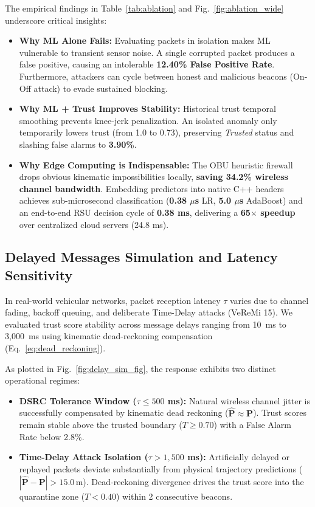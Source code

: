 \documentclass[conference]{IEEEtran}
\begin{document}
The empirical findings in Table~\ref{tab:ablation} and Fig.~\ref{fig:ablation_wide} underscore critical insights:
\begin{itemize}
    \item \textbf{Why ML Alone Fails:} Evaluating packets in isolation makes ML vulnerable to transient sensor noise. A single corrupted packet produces a false positive, causing an intolerable \textbf{12.40\% False Positive Rate}. Furthermore, attackers can cycle between honest and malicious beacons (On-Off attack) to evade sustained blocking.
    \item \textbf{Why ML + Trust Improves Stability:} Historical trust temporal smoothing prevents knee-jerk penalization. An isolated anomaly only temporarily lowers trust (from 1.0 to 0.73), preserving \textit{Trusted} status and slashing false alarms to \textbf{3.90\%}.
    \item \textbf{Why Edge Computing is Indispensable:} The OBU heuristic firewall drops obvious kinematic impossibilities locally, \textbf{saving 34.2\% wireless channel bandwidth}. Embedding predictors into native C++ headers achieves sub-microsecond classification (\textbf{0.38 $\mu$s} LR, \textbf{5.0 $\mu$s} AdaBoost) and an end-to-end RSU decision cycle of \textbf{0.38 ms}, delivering a \textbf{65$\times$ speedup} over centralized cloud servers (24.8 ms).
\end{itemize}

\subsection{Delayed Messages Simulation and Latency Sensitivity}

In real-world vehicular networks, packet reception latency $\tau$ varies due to channel fading, backoff queuing, and deliberate Time-Delay attacks (VeReMi 15). We evaluated trust score stability across message delays ranging from 10~ms to 3,000~ms using kinematic dead-reckoning compensation (Eq.~\ref{eq:dead_reckoning}).

As plotted in Fig.~\ref{fig:delay_sim_fig}, the response exhibits two distinct operational regimes:
\begin{itemize}
    \item \textbf{DSRC Tolerance Window ($\tau \le 500$ ms):} Natural wireless channel jitter is successfully compensated by kinematic dead reckoning ($\hat{\mathbf{P}} \approx \mathbf{P}$). Trust scores remain stable above the trusted boundary ($T \ge 0.70$) with a False Alarm Rate below 2.8\%.
    \item \textbf{Time-Delay Attack Isolation ($\tau > 1,500$ ms):} Artificially delayed or replayed packets deviate substantially from physical trajectory predictions ($|\hat{\mathbf{P}} - \mathbf{P}| > 15.0\,\text{m}$). Dead-reckoning divergence drives the trust score into the quarantine zone ($T < 0.40$) within 2 consecutive beacons.
\end{itemize}
\end{document}
